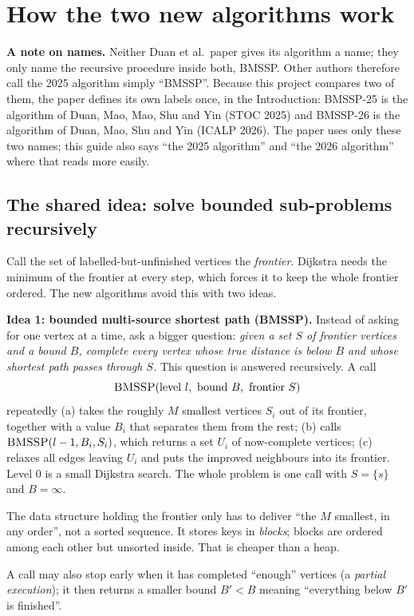 \documentclass[11pt,a4paper]{article}
\newcommand{\bmA}{BMSSP-25}
\newcommand{\bmB}{BMSSP-26}
\begin{document}
\section{How the two new algorithms work}
\textbf{A note on names.} Neither Duan et al.\ paper gives its algorithm a name; they only name the recursive procedure inside both, BMSSP. Other authors therefore call the 2025 algorithm simply ``BMSSP''. Because this project compares two of them, the paper defines its own labels once, in the Introduction: \bmA{} is the algorithm of Duan, Mao, Mao, Shu and Yin (STOC 2025) and \bmB{} is the algorithm of Duan, Mao, Shu and Yin (ICALP 2026). The paper uses only these two names; this guide also says ``the 2025 algorithm'' and ``the 2026 algorithm'' where that reads more easily.

\subsection{The shared idea: solve bounded sub-problems recursively}
Call the set of labelled-but-unfinished vertices the \emph{frontier}. Dijkstra needs the minimum of the frontier at every step, which forces it to keep the whole frontier ordered. The new algorithms avoid this with two ideas.

\textbf{Idea 1: bounded multi-source shortest path (BMSSP).} Instead of asking for one vertex at a time, ask a bigger question: \emph{given a set $S$ of frontier vertices and a bound $B$, complete every vertex whose true distance is below $B$ and whose shortest path passes through $S$.} This question is answered recursively. A call
\[
\textsc{BMSSP}(\text{level } l,\ \text{bound } B,\ \text{frontier } S)
\]
repeatedly (a) takes the roughly $M$ smallest vertices $S_i$ out of its frontier, together with a value $B_i$ that separates them from the rest; (b) calls $\textsc{BMSSP}(l-1,B_i,S_i)$, which returns a set $U_i$ of now-complete vertices; (c) relaxes all edges leaving $U_i$ and puts the improved neighbours into its frontier. Level $0$ is a small Dijkstra search. The whole problem is one call with $S=\{s\}$ and $B=\infty$.

The data structure holding the frontier only has to deliver ``the $M$ smallest, in any order'', not a sorted sequence. It stores keys in \emph{blocks}; blocks are ordered among each other but unsorted inside. That is cheaper than a heap.

A call may also stop early when it has completed ``enough'' vertices (a \emph{partial execution}); it then returns a smaller bound $B'<B$ meaning ``everything below $B'$ is finished''.
\end{document}
